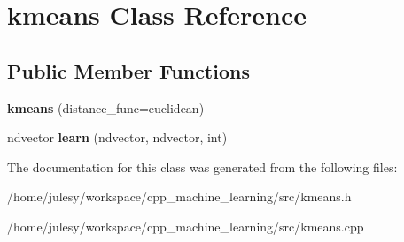 \hypertarget{classkmeans}{\section{kmeans Class Reference}
\label{classkmeans}
}
\subsection*{Public Member Functions}
\begin{DoxyCompactItemize}
\item 
\hypertarget{classkmeans_ab970eeea3d333d30299b0a1190c51d07}{{\bfseries kmeans} (distance\-\_\-func=euclidean)}\label{classkmeans_ab970eeea3d333d30299b0a1190c51d07}

\item 
\hypertarget{classkmeans_a02812b434b5a09cb14fa00e415586fdd}{ndvector {\bfseries learn} (ndvector, ndvector, int)}\label{classkmeans_a02812b434b5a09cb14fa00e415586fdd}

\end{DoxyCompactItemize}


The documentation for this class was generated from the following files\-:\begin{DoxyCompactItemize}
\item 
/home/julesy/workspace/cpp\-\_\-machine\-\_\-learning/src/kmeans.\-h\item 
/home/julesy/workspace/cpp\-\_\-machine\-\_\-learning/src/kmeans.\-cpp\end{DoxyCompactItemize}
